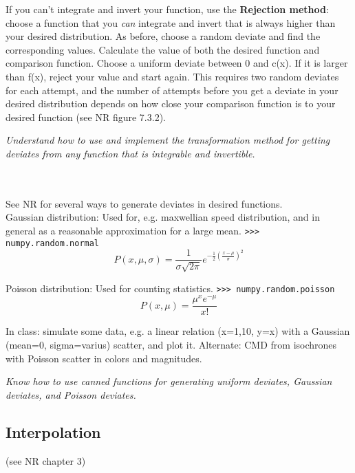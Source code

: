 \documentclass[12pt]{article}
\begin{document}
If you can't integrate and invert your function, use the \textbf{Rejection
method}: choose a function that you \emph{can} integrate and invert that is
always higher than your desired distribution. As before, choose a random deviate
and find the corresponding values. Calculate the value of both
the desired function and comparison function. Choose a uniform deviate between
0 and c(x). If it is larger than f(x), reject your value and start again.
This requires two random deviates for each attempt, and the number of attempts
before you get a deviate in your desired distribution depends on how close your
comparison function is to your desired function (see NR figure 7.3.2). \\

\colorbox{hl}{\parbox{0.9\textwidth}
{\emph{Understand how to use and implement the transformation method for
getting deviates from any function that is integrable and invertible.}}}
\\\\ See NR for several ways to generate deviates in desired functions. \\

Gaussian distribution:
Used for, e.g. maxwellian speed distribution, and in general as a
reasonable approximation for a large mean.
\texttt{>>> numpy.random.normal}
\begin{equation*}
    P(x,\mu,\sigma) = \frac{1}{\sigma\sqrt{2\pi}}
    e^{-\frac{1}{2}(\frac{x-\mu}{\sigma})^2   }
\end{equation*}

Poisson distribution:
Used for counting statistics.
\texttt{>>> numpy.random.poisson}
\begin{equation*}
    P(x,\mu) = \frac{\mu^xe^{-\mu}}{x!}
\end{equation*}

In class: simulate some data, e.g. a linear relation (x=1,10, y=x) with a
Gaussian (mean=0, sigma=varius) scatter, and plot it. Alternate: CMD from
isochrones with Poisson scatter in colors and magnitudes. \\

\colorbox{hl}{\parbox{0.9\textwidth}
{\emph{Know how to use canned functions for generating uniform deviates,
Gaussian deviates, and Poisson deviates.}}}

\subsection{Interpolation}
(see NR chapter 3)
\end{document}
